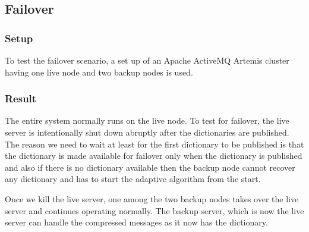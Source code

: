\subsection{Failover} \label{failover}

\subsubsection{Setup}

To test the failover scenario, a set up of an Apache ActiveMQ Artemis cluster having one live node and two backup nodes is used.

\subsubsection{Result}

The entire system normally runs on the live node. To test for failover, the live server is intentionally shut down abruptly after the dictionaries are published. The reason we need to wait at least for the first dictionary to be published is that the dictionary is made available for failover only when the dictionary is published and also if there is no dictionary available then the backup node cannot recover any dictionary and has to start the adaptive algorithm from the start.

Once we kill the live server, one among the two backup nodes takes over the live server and continues operating normally. The backup server, which is now the live server can handle the compressed messages as it now has the dictionary.


